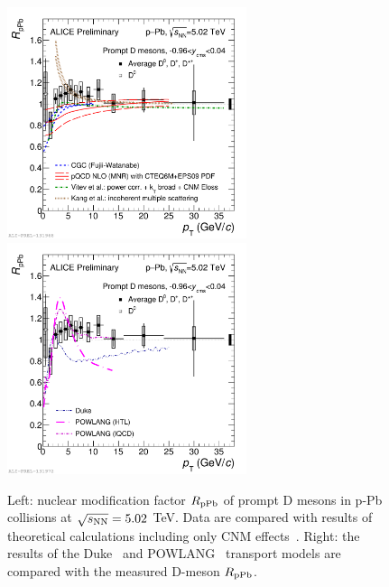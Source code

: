 \begin{figure}[!ht]
  \centering
    \includegraphics[width=7cm]{FigCap2/2017-Jul-05-pPbWithModelsCNM.pdf}
    \includegraphics[width=7cm]{FigCap2/pPbWithModelsMedium.pdf}
  \caption{Left: nuclear modification factor $R_{\rm pPb}$ of prompt D mesons in p-Pb collisions at $\sqrt{s_{\rm NN}} = 5.02$ TeV. Data are compared with results of theoretical calculations including only CNM effects~\cite{Fujii:2017rqa,Cacciari:2012ny,Eskola:2016oht,Sharma:2009hn,Kang:2014hha}. Right: the results of the Duke~\cite{Xu:2015iha} and POWLANG~\cite{Beraudo:2015wsd} transport models are compared with the measured D-meson $R_{\rm pPb}$.}
  \label{fig:RpA}
\end{figure}


